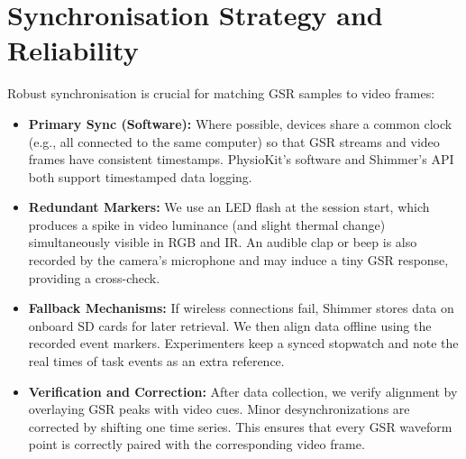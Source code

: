 \documentclass{article}
\begin{document}
\section{Synchronisation Strategy and Reliability}
Robust synchronisation is crucial for matching GSR samples to video frames:
\begin{itemize}
    \item \textbf{Primary Sync (Software):} Where possible, devices share a common clock (e.g., all connected to the same computer) so that GSR streams and video frames have consistent timestamps. PhysioKit’s software and Shimmer’s API both support timestamped data logging.
    \item \textbf{Redundant Markers:} We use an LED flash at the session start, which produces a spike in video luminance (and slight thermal change) simultaneously visible in RGB and IR. An audible clap or beep is also recorded by the camera’s microphone and may induce a tiny GSR response, providing a cross-check.
    \item \textbf{Fallback Mechanisms:} If wireless connections fail, Shimmer stores data on onboard SD cards for later retrieval. We then align data offline using the recorded event markers. Experimenters keep a synced stopwatch and note the real times of task events as an extra reference.
    \item \textbf{Verification and Correction:} After data collection, we verify alignment by overlaying GSR peaks with video cues. Minor desynchronizations are corrected by shifting one time series. This ensures that every GSR waveform point is correctly paired with the corresponding video frame.
\end{itemize}
\end{document}

